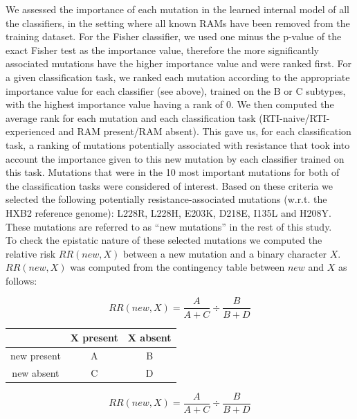 \documentclass[
  11pt,
  twoside]{scrbook}
\begin{document}
We assessed the importance of each mutation in the learned internal
model of all the classifiers, in the setting where all known RAMs have
been removed from the training dataset. For the Fisher classifier, we
used one minus the p-value of the exact Fisher test as the importance
value, therefore the more significantly associated mutations have the
higher importance value and were ranked first. For a given
classification task, we ranked each mutation according to the
appropriate importance value for each classifier (see above), trained on
the B or C subtypes, with the highest importance value having a rank of 0. We then computed the average rank for each mutation and each
classification task (RTI-naive/RTI-experienced and RAM present/RAM
absent). This gave us, for each classification task, a ranking of
mutations potentially associated with resistance that took into account
the importance given to this new mutation by each classifier trained on
this task. Mutations that were in the 10 most important mutations for
both of the classification tasks were considered of interest. Based on
these criteria we selected the following potentially
resistance-associated mutations (w.r.t. the HXB2 reference genome):
L228R, L228H, E203K, D218E, I135L and H208Y. These mutations are
referred to as ``new mutations'' in the rest of this study.\\
To check the epistatic nature of these selected mutations we computed
the relative risk \(RR(new, X)\) between a new mutation and a binary
character \(X\). \(RR(new,X)\) was computed from the contingency table
between \(new\) and \(X\) as follows:

\begin{htmlonly}
\[
RR(new,X) = \frac{A}{A+C} \div \frac{B}{B+D}
\]

\end{htmlonly}

\begin{minipage}{0.45\textwidth}
    \bigskip
    \begin{tabular}{ccc}
                    & X present & X absent\\ \midrule
        new present & A         & B       \\
        new absent  & C         & D       \\ \bottomrule
    \end{tabular}
\end{minipage}
\begin{minipage}{0.45\textwidth}
    \begin{equation*}
        RR(new,X) = \frac{A}{A+C} \div \frac{B}{B+D}
    \end{equation*}
\end{minipage}
\bigskip
\end{document}
